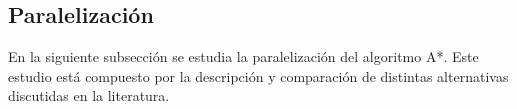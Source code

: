 \pagebreak

\subsection{Paralelización}

En la siguiente subsección
se estudia la paralelización
del algoritmo A*.
Este estudio está compuesto por la descripción y
comparación de distintas alternativas discutidas en
la literatura.







    





